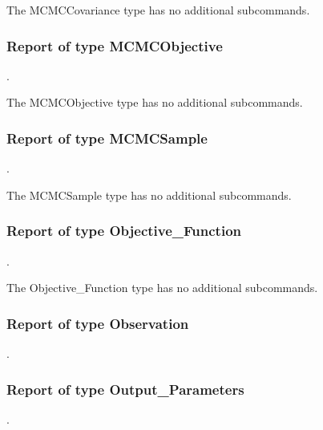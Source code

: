 The MCMCCovariance type has no additional subcommands.
\subsubsection{Report of type MCMCObjective}
.
\label{syntax:Report-MCMCObjective}

The MCMCObjective type has no additional subcommands.
\subsubsection{Report of type MCMCSample}
.
\label{syntax:Report-MCMCSample}

The MCMCSample type has no additional subcommands.



\subsubsection{Report of type Objective\_Function}
.
\label{syntax:Report-ObjectiveFunction}

The Objective\_Function type has no additional subcommands.

\subsubsection{Report of type Observation}
.
\label{syntax:Report-Observation}




\subsubsection{Report of type Output\_Parameters}
.
\label{syntax:Report-OutputParameters}

